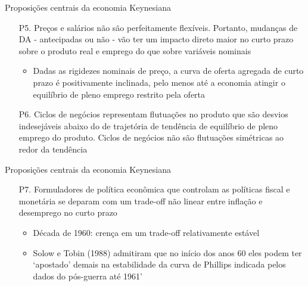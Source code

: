 \documentclass[10pt]{beamer}
\begin{document}
\begin{frame}{Proposições centrais da economia Keynesiana}
    \begin{enumerate}
        \item[P5.] Preços e salários não são perfeitamente flexíveis. Portanto, mudanças de DA - antecipadas ou não - vão ter um impacto direto maior no curto prazo sobre o produto real e emprego do que sobre variáveis nominais
        \medskip
        \begin{itemize}
            \item Dadas as rigidezes nominais de preço, a curva de oferta agregada de curto prazo é positivamente inclinada, pelo menos até a economia atingir o equilíbrio de pleno emprego restrito pela oferta
        \end{itemize}
        \bigskip
        \item[P6.] Ciclos de negócios representam flutuações no produto que são desvios indesejáveis abaixo do de trajetória de tendência de equilíbrio de pleno emprego do produto. Ciclos de negócios não são flutuações simétricas ao redor da tendência
    \end{enumerate}
\end{frame}

\begin{frame}{Proposições centrais da economia Keynesiana}
    \begin{enumerate}
        \item[P7.] Formuladores de política econômica que controlam as políticas fiscal e monetária se deparam com um trade-off não linear entre inflação e desemprego no curto prazo
        \bigskip
        \begin{itemize}
            \item Década de 1960: crença em um trade-off relativamente estável
            \medskip
            \item Solow e Tobin (1988) admitiram que no início dos anos 60 eles podem ter `apostado' demais na estabilidade da curva de Phillips indicada pelos dados do pós-guerra até 1961'
        \end{itemize}
    \end{enumerate}
\end{frame}
\end{document}
